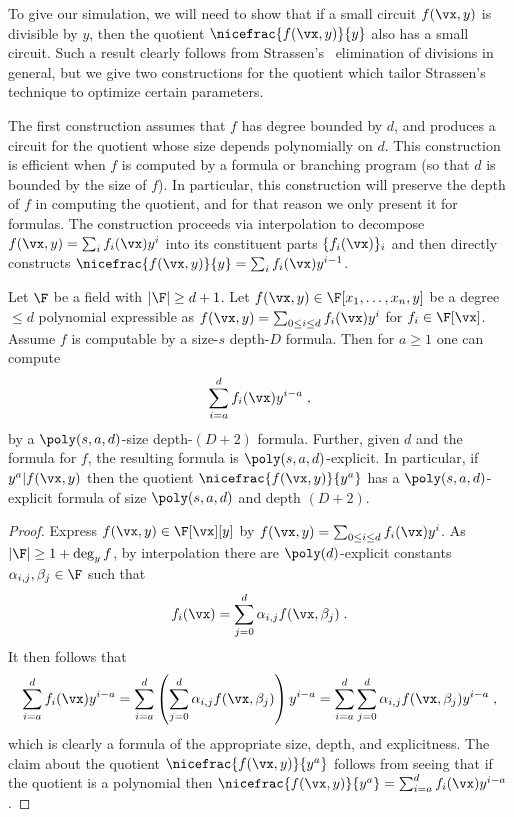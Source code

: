 \documentclass{toc}
\begin{document}
To give our simulation, we will need to show that if a small circuit $f(\vx,y)$ is divisible by $y$, then the quotient $\nicefrac{f(\vx,y)}{y}$ also has a small circuit. Such a result clearly follows from Strassen's~\cite{Strassen73} elimination of divisions in general, but we give two constructions for the quotient which tailor Strassen's~\cite{Strassen73} technique to optimize certain parameters.

The first construction assumes that $f$ has degree bounded by $d$, and produces a circuit for the quotient whose size depends polynomially on $d$.  This construction is efficient when $f$ is computed by a formula or branching program (so that $d$ is bounded by the size of $f$).  In particular, this construction will preserve the depth of $f$ in computing the quotient, and
for that reason we only present it for formulas.  The construction proceeds via interpolation to decompose $f(\vx,y)=\sum_i f_i(\vx)y^i$ into its constituent parts $\{f_i(\vx)\}_i$ and then directly constructs $\nicefrac{f(\vx,y)}{y}=\sum_i f_i(\vx)y^{i-1}$.%


\begin{lemma}\label{res:divide-by-y:black-box}
        Let $\F$ be a field with $|\F|\ge d+1$.  Let $f(\vx,y)\in\F[x_1,\ldots,x_n,y]$ be a degree $\le d$ polynomial expressible as $f(\vx,y)=\sum_{0\le i\le d} f_i(\vx)y^i$ for $f_i\in\F[\vx]$.  Assume $f$ is computable by a size-$s$ depth-$D$ formula. Then for $a\ge 1$ one can compute
        \[
                \sum_{i=a}^d f_i(\vx) y^{i-a}
                \;,
        \]
        by a $\poly(s,a,d)$-size depth-$(D+2)$ formula.  Further, given $d$ and the formula for $f$, the resulting formula is $\poly(s,a,d)$-explicit. In particular, if $y^a|f(\vx,y)$ then the quotient $\nicefrac{f(\vx,y)}{y^a}$ has a $\poly(s,a,d)$-explicit formula of size $\poly(s,a,d)$ and depth $(D+2)$.
\end{lemma}
\begin{proof}
        Express $f(\vx,y)\in\F[\vx][y]$ by $f(\vx,y)=\sum_{0\le i\le d} f_i(\vx)y^i$. As $|\F|\ge 1+\deg_y f$, by interpolation there are $\poly(d)$-explicit constants $\alpha_{i,j},\beta_j\in\F$ such that
        \[
                f_i(\vx)=\sum_{j=0}^d \alpha_{i,j}f(\vx,\beta_j)
                \;.
        \]
        It then follows that
        \[
                \sum_{i=a}^d f_i(\vx) y^{i-a}
                =\sum_{i=a}^d \left(\sum_{j=0}^d \alpha_{i,j}f(\vx,\beta_j)\right) y^{i-a}
                =\sum_{i=a}^d \sum_{j=0}^d \alpha_{i,j}f(\vx,\beta_j) y^{i-a}
                \;,
        \]
        which is clearly a formula of the appropriate size, depth, and explicitness. The claim about the quotient $\nicefrac{f(\vx,y)}{y^a}$ follows from seeing that if the quotient is a polynomial then $\nicefrac{f(\vx,y)}{y^a}=\sum_{i=a}^d f_i(\vx) y^{i-a}$.
\end{proof}
\end{document}
